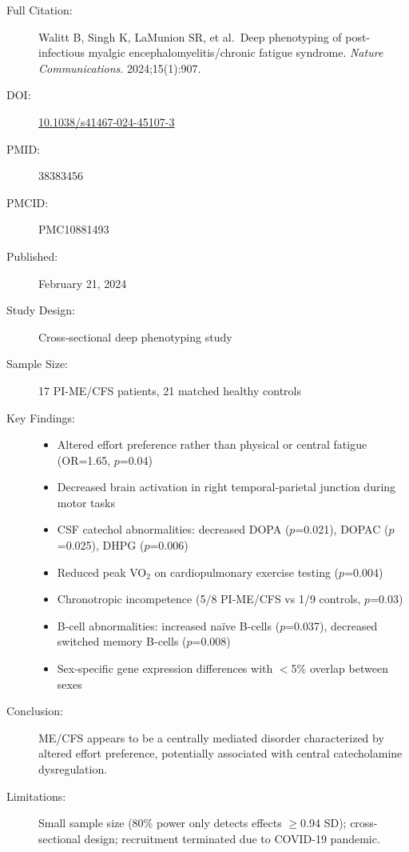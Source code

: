 \begin{description}
    \item[Full Citation:] Walitt B, Singh K, LaMunion SR, et al.\ Deep phenotyping of post-infectious myalgic encephalomyelitis/chronic fatigue syndrome. \textit{Nature Communications}. 2024;15(1):907.
    \item[DOI:] \href{https://doi.org/10.1038/s41467-024-45107-3}{10.1038/s41467-024-45107-3}
    \item[PMID:] 38383456
    \item[PMCID:] PMC10881493
    \item[Published:] February 21, 2024
    \item[Study Design:] Cross-sectional deep phenotyping study
    \item[Sample Size:] 17 PI-ME/CFS patients, 21 matched healthy controls
    \item[Key Findings:]
    \begin{itemize}
        \item Altered effort preference rather than physical or central fatigue (OR=1.65, $p$=0.04)
        \item Decreased brain activation in right temporal-parietal junction during motor tasks
        \item CSF catechol abnormalities: decreased DOPA ($p$=0.021), DOPAC ($p$=0.025), DHPG ($p$=0.006)
        \item Reduced peak VO$_2$ on cardiopulmonary exercise testing ($p$=0.004)
        \item Chronotropic incompetence (5/8 PI-ME/CFS vs 1/9 controls, $p$=0.03)
        \item B-cell abnormalities: increased na\"ive B-cells ($p$=0.037), decreased switched memory B-cells ($p$=0.008)
        \item Sex-specific gene expression differences with $<$5\% overlap between sexes
    \end{itemize}
    \item[Conclusion:] ME/CFS appears to be a centrally mediated disorder characterized by altered effort preference, potentially associated with central catecholamine dysregulation.
    \item[Limitations:] Small sample size (80\% power only detects effects $\geq$0.94 SD); cross-sectional design; recruitment terminated due to COVID-19 pandemic.
\end{description}

